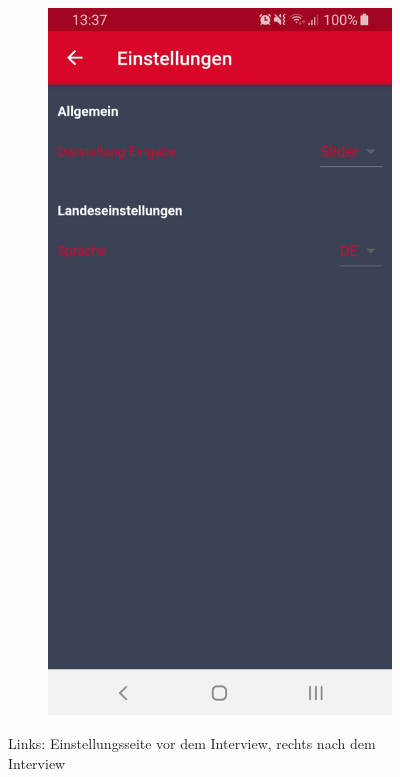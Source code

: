 \begin{figure}[H]
\begin{subfigure}[b]{0.45\textwidth}
		\end{subfigure}
		\hfill
		\begin{subfigure}[b]{0.45\textwidth}
			\includegraphics[width=1\textwidth]{../include/images/usertests/colorSettings/after}
		\end{subfigure}
		\caption{Links: Einstellungsseite vor dem Interview, rechts nach dem Interview}
		\label{img:colorSettings}
	\end{figure}
	
